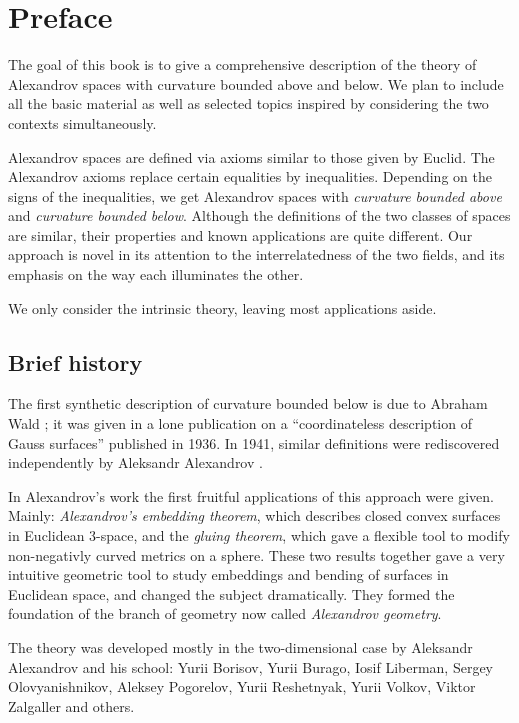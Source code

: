 \chapter*{Preface}

The goal of this book is to give a comprehensive description of the theory of Alexandrov spaces 
with curvature bounded above and below.
We plan to include all the basic material as well as selected topics inspired by considering the two contexts simultaneously.

Alexandrov spaces are defined via axioms similar to those given by Euclid.
The Alexandrov axioms replace certain  equalities by inequalities. 
Depending on the signs of the inequalities, we get Alexandrov spaces with \emph{curvature bounded above} and \emph{curvature bounded below}.
Although the definitions of the two classes of spaces are similar, their properties and known applications are quite different.
Our approach is novel in its attention to the interrelatedness of the two fields, and its emphasis on the way each illuminates the other.

We only consider  the intrinsic theory, leaving most applications aside.


\section*{Brief history}

The first synthetic description of curvature {\color{red} bounded below} is due to Abraham Wald \cite{wald}; 
it was given in a lone publication on a ``coordinateless description of Gauss surfaces'' published in 1936.
In 1941, similar definitions were rediscovered independently by Aleksandr Alexandrov \cite{alexandrov:def}.

In Alexandrov's work the first fruitful applications of this approach were given.
Mainly: \emph{Alexandrov's embedding theorem}, which describes closed convex surfaces in Euclidean 3-space,
and the \emph{gluing theorem}, which gave a flexible tool to modify non-negativly curved metrics on a sphere.
These two results together gave  a very intuitive geometric tool to study embeddings and bending of surfaces in Euclidean space, and changed the subject dramatically.
They formed the foundation of the branch of geometry now called \emph{Alexandrov geometry}.


The theory was developed mostly in the two-dimensional case 
by Aleksandr Alexandrov
and his school:  
Yurii  Borisov,
Yurii  Burago,
Iosif  Liberman,
Sergey  Olovyanishnikov,
Aleksey  Pogorelov,
Yurii  Reshetnyak,
Yurii  Volkov,
Viktor  Zalgaller and others.

